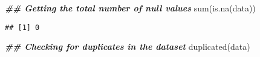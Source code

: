 \documentclass[
]{article}
\newenvironment{Shaded}{\begin{snugshade}}{\end{snugshade}}
\newcommand{\DocumentationTok}[1]{\textcolor[rgb]{0.56,0.35,0.01}{\textbf{\textit{#1}}}}
\newcommand{\FunctionTok}[1]{\textcolor[rgb]{0.00,0.00,0.00}{#1}}
\newcommand{\NormalTok}[1]{#1}
\begin{document}
\begin{Shaded}
\begin{Highlighting}[]
\DocumentationTok{\#\# Getting the total number of null values}
\FunctionTok{sum}\NormalTok{(}\FunctionTok{is.na}\NormalTok{(data))}
\end{Highlighting}
\end{Shaded}

\begin{verbatim}
## [1] 0
\end{verbatim}

\begin{Shaded}
\begin{Highlighting}[]
\DocumentationTok{\#\# Checking for duplicates in the dataset}
\FunctionTok{duplicated}\NormalTok{(data)}
\end{Highlighting}
\end{Shaded}
\end{document}
